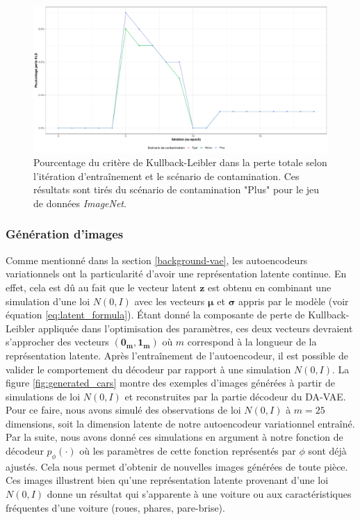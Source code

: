 \begin{figure}[H]
	\centering
	\includegraphics[width=\linewidth]{images/kld_cars.pdf}
	\caption[Pourcentage du critère de Kullback-Leibler dans la perte totale selon l'itération d'entraînement et le scénario de contamination.]{Pourcentage du critère de Kullback-Leibler dans la perte totale selon l'itération d'entraînement et le scénario de contamination. Ces résultats sont tirés du scénario de contamination "Plus" pour le jeu de données \textit{ImageNet}.}
	\label{fig:cars_kld_perc}
\end{figure}


\subsubsection{Génération d'images}

Comme mentionné dans la section \ref{background-vae}, les autoencodeurs variationnels ont la particularité d'avoir une représentation latente continue. En effet, cela est dû au fait que le vecteur latent $\boldsymbol{z}$ est obtenu en combinant une simulation d'une loi $N(0,I)$ avec les vecteurs $\boldsymbol{\mu}$ et $\boldsymbol{\sigma}$ appris par le modèle (voir équation \ref{eq:latent_formula}). Étant donné la composante de perte de Kullback-Leibler appliquée dans l'optimisation des paramètres, ces deux vecteurs devraient s'approcher des vecteurs $(\boldsymbol{0_{m}}, \boldsymbol{1_{m}})$ où $m$ correspond à la longueur de la représentation latente. Après l'entraînement de l'autoencodeur, il est possible de valider le comportement du décodeur par rapport à une simulation $N(0,I)$. La figure \ref{fig:generated_cars} montre des exemples d'images générées à partir de simulations de loi $N(0,I)$ et reconstruites par la partie décodeur du DA-VAE. Pour ce faire, nous avons simulé des observations de loi $N(0,I)$ à $m=25$ dimensions, soit la dimension latente de notre autoencodeur variationnel entraîné. Par la suite, nous avons donné ces simulations en argument à notre fonction de décodeur $p_{\phi}(\cdot)$ où les paramètres de cette fonction représentés par $\phi$ sont déjà ajustés. Cela nous permet d'obtenir de nouvelles images générées de toute pièce. Ces images illustrent bien qu'une représentation latente provenant d'une loi $N(0,I)$ donne un résultat qui s'apparente à une voiture ou aux caractéristiques fréquentes d'une voiture (roues, phares, pare-brise).

